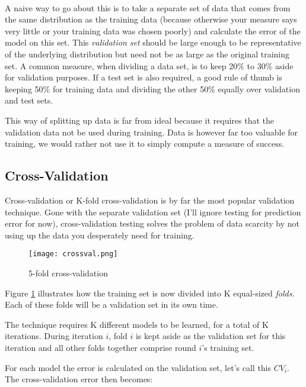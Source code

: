 \paragraph{}
A naive way to go about this
is to take a separate set of data
that comes from the same distribution
as the training data
(because otherwise your measure says very little
or your training data was chosen poorly)
and calculate the error of the model on this set.
This \textit{validation set} should be large enough
to be representative of the underlying distribution
but need not be as large as the original training set.
A common measure,
when dividing a data set,
is to keep 20\% to 30\% aside
for validation purposes.
If a test set is also required,
a good rule of thumb is keeping
50\% for training data
and dividing the other 50\%
equally over validation and test sets.

This way of splitting up data is far from ideal
because it requires that the validation data
not be used during training.
Data is however far too valuable for training,
we would rather not use it to simply
compute a measure of success.

\subsection{Cross-Validation}
Cross-validation or K-fold cross-validation
is by far the most popular validation technique.
Gone with the separate validation set
(I'll ignore testing for prediction error for now),
cross-validation testing solves
the problem of data scarcity by not using up
the data you desperately need for training.

\begin{figure}[h]
\center
\texttt{[image: crossval.png]}
\caption[5-fold cross-validation]{
5-fold cross-validation
\parencite{Zhang2011}
}
\label{fig:crossval}
\end{figure}

Figure \ref{fig:crossval} illustrates
how the training set is now divided into
K equal-sized \textit{folds}.
Each of these folds will be a validation set
in its own time.

The technique requires K
different models to be learned,
for a total of K iterations.
During iteration $i$,
fold $i$ is kept aside
as the validation set for this iteration
and all other folds together comprise
round $i$'s training set.

For each model the error is calculated on the validation
set, let's call this $\textit{CV}_i$.
The cross-validation error then becomes:

